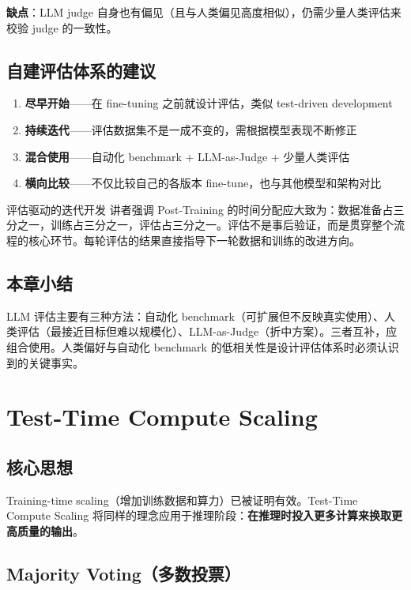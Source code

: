 \documentclass[a4paper]{article}
\begin{document}
\textbf{缺点}：LLM judge 自身也有偏见（且与人类偏见高度相似），仍需少量人类评估来校验 judge 的一致性。

\subsection{自建评估体系的建议}

\begin{enumerate}
    \item \textbf{尽早开始}——在 fine-tuning 之前就设计评估，类似 test-driven development
    \item \textbf{持续迭代}——评估数据集不是一成不变的，需根据模型表现不断修正
    \item \textbf{混合使用}——自动化 benchmark + LLM-as-Judge + 少量人类评估
    \item \textbf{横向比较}——不仅比较自己的各版本 fine-tune，也与其他模型和架构对比
\end{enumerate}

\begin{knowledgebox}{评估驱动的迭代开发}
讲者强调 Post-Training 的时间分配应大致为：数据准备占三分之一，训练占三分之一，评估占三分之一。评估不是事后验证，而是贯穿整个流程的核心环节。每轮评估的结果直接指导下一轮数据和训练的改进方向。
\end{knowledgebox}

\subsection{本章小结}

LLM 评估主要有三种方法：自动化 benchmark（可扩展但不反映真实使用）、人类评估（最接近目标但难以规模化）、LLM-as-Judge（折中方案）。三者互补，应组合使用。人类偏好与自动化 benchmark 的低相关性是设计评估体系时必须认识到的关键事实。

\newpage
\section{Test-Time Compute Scaling}

\subsection{核心思想}

Training-time scaling（增加训练数据和算力）已被证明有效。Test-Time Compute Scaling 将同样的理念应用于推理阶段：\textbf{在推理时投入更多计算来换取更高质量的输出}。

\subsection{Majority Voting（多数投票）}
\end{document}
